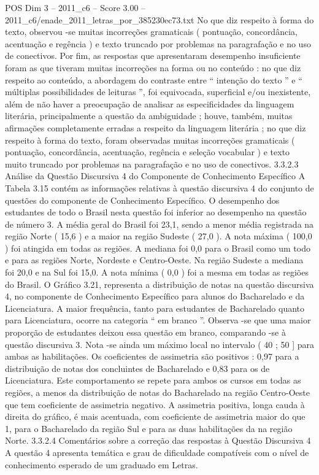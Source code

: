 \begin{textsample}{POS Dim 3 – 2011\_c6 – Score 3.00 – 2011\_c6/enade\_2011\_letras\_por\_385230ec73.txt}
No que diz respeito à forma do texto, observou -se muitas incorreções gramaticais ( pontuação, concordância, acentuação e regência ) e texto truncado por problemas na paragrafação e no uso de conectivos.
Por fim, as respostas que apresentaram desempenho insuficiente foram as que tiveram muitas incorreções na forma ou no conteúdo : no que diz respeito ao conteúdo, a abordagem do contraste entre “ intenção do texto ” e “ múltiplas possibilidades de leituras ”, foi equivocada, superficial e/ou inexistente, além de não haver a preocupação de analisar as especificidades da linguagem literária, principalmente a questão da ambiguidade ; houve, também, muitas afirmações completamente erradas a respeito da linguagem literária ; no que diz respeito à forma do texto, foram observadas muitas incorreções gramaticais ( pontuação, concordância, acentuação, regência e seleção vocabular ) e texto muito truncado por problemas na paragrafação e no uso de conectivos. 3.3.2.3 Análise da Questão Discursiva 4 do Componente de Conhecimento Específico A Tabela 3.15 contém as informações relativas à questão discursiva 4 do conjunto de questões do componente de Conhecimento Específico.
O desempenho dos estudantes de todo o Brasil nesta questão foi inferior ao desempenho na questão de número 3.
A média geral do Brasil foi 23,1, sendo a menor média registrada na região Norte ( 15,6 ) e a maior na região Sudeste ( 27,0 ).
A nota máxima ( 100,0 ) foi atingida em todas as regiões.
A mediana foi 0,0 para o Brasil como um todo e para as regiões Norte, Nordeste e Centro-Oeste.
Na região Sudeste a mediana foi 20,0 e na Sul foi 15,0.
A nota mínima ( 0,0 ) foi a mesma em todas as regiões do Brasil.
O Gráfico 3.21, representa a distribuição de notas na questão discursiva 4, no componente de Conhecimento Específico para alunos do Bacharelado e da Licenciatura.
A maior frequência, tanto para estudantes de Bacharelado quanto para Licenciatura, ocorre na categoria “ em branco ”.
Observa -se que uma maior proporção de estudantes deixou essa questão em branco, comparando -se à questão discursiva 3.
Nota -se ainda um máximo local no intervalo ( 40 ; 50 ] para ambas as habilitações.
Os coeficientes de assimetria são positivos : 0,97 para a distribuição de notas dos concluintes de Bacharelado e 0,83 para os de Licenciatura.
Este comportamento se repete para ambos os cursos em todas as regiões, a menos da distribuição de notas do Bacharelado na região Centro-Oeste que tem coeficiente de assimetria negativo.
A assimetria positiva, longa cauda à direita do gráfico, é mais acentuada, com coeficiente de assimetria maior do que 1, para o Bacharelado da região Sul e para as duas habilitações da na região Norte. 3.3.2.4 Comentários sobre a correção das respostas à Questão Discursiva 4 A questão 4 apresenta temática e grau de dificuldade compatíveis com o nível de conhecimento esperado de um graduado em Letras.

\end{textsample}
